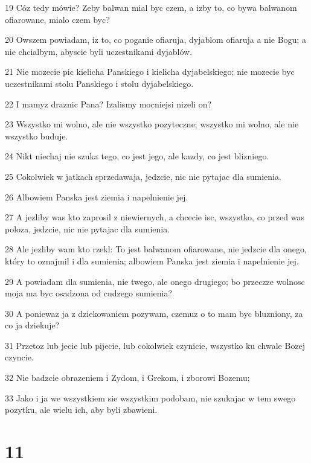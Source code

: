 \par 19 Cóz tedy mówie? Zeby balwan mial byc czem, a izby to, co bywa balwanom ofiarowane, mialo czem byc?
\par 20 Owszem powiadam, iz to, co poganie ofiaruja, dyjablom ofiaruja a nie Bogu; a nie chcialbym, abyscie byli uczestnikami dyjablów.
\par 21 Nie mozecie pic kielicha Panskiego i kielicha dyjabelskiego; nie mozecie byc uczestnikami stolu Panskiego i stolu dyjabelskiego.
\par 22 I mamyz draznic Pana? Izalismy mocniejsi nizeli on?
\par 23 Wszystko mi wolno, ale nie wszystko pozyteczne; wszystko mi wolno, ale nie wszystko buduje.
\par 24 Nikt niechaj nie szuka tego, co jest jego, ale kazdy, co jest blizniego.
\par 25 Cokolwiek w jatkach sprzedawaja, jedzcie, nic nie pytajac dla sumienia.
\par 26 Albowiem Panska jest ziemia i napelnienie jej.
\par 27 A jezliby was kto zaprosil z niewiernych, a chcecie isc, wszystko, co przed was poloza, jedzcie, nic nie pytajac dla sumienia.
\par 28 Ale jezliby wam kto rzekl: To jest balwanom ofiarowane, nie jedzcie dla onego, który to oznajmil i dla sumienia; albowiem Panska jest ziemia i napelnienie jej.
\par 29 A powiadam dla sumienia, nie twego, ale onego drugiego; bo przeczze wolnosc moja ma byc osadzona od cudzego sumienia?
\par 30 A poniewaz ja z dziekowaniem pozywam, czemuz o to mam byc bluzniony, za co ja dziekuje?
\par 31 Przetoz lub jecie lub pijecie, lub cokolwiek czynicie, wszystko ku chwale Bozej czyncie.
\par 32 Nie badzcie obrazeniem i Zydom, i Grekom, i zborowi Bozemu;
\par 33 Jako i ja we wszystkiem sie wszystkim podobam, nie szukajac w tem swego pozytku, ale wielu ich, aby byli zbawieni.

\chapter{11}

